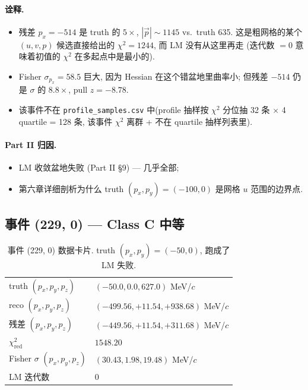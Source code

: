 \paragraph{诠释.}
\begin{itemize}[nosep]
  \item 残差 $p_x = -514$ 是 truth 的 $5\times$, $|\vec p| \sim 1145$ vs.\ truth 635. 这是粗网格的某个 $(u, v, p)$ 候选直接给出的 $\chi^2 = 1244$, 而 LM 没有从这里再走 (迭代数 $= 0$ 意味着初值的 $\chi^2$ 在多起点中是最小的).
  \item Fisher $\sigma_{p_x} = 58.5$ 巨大, 因为 Hessian 在这个错盆地里曲率小; 但残差 $-514$ 仍是 $\sigma$ 的 $8.8\times$, pull $z = -8.78$.
  \item 该事件不在 \texttt{profile\_samples.csv} 中(profile 抽样按 $\chi^2$ 分位抽 32 条 $\times$ 4 quartile = 128 条, 该事件 $\chi^2$ 离群 + 不在 quartile 抽样列表里).
\end{itemize}

\paragraph{Part II 归因.}
\begin{itemize}[nosep]
  \item LM 收敛盆地失败 (Part II §9) — 几乎全部;
  \item 第六章详细剖析为什么 truth $(p_x, p_y) = (-100, 0)$ 是网格 $u$ 范围的边界点.
\end{itemize}

\subsection{事件 (229, 0) — Class C 中等}
\label{sec:partIII:case_studies:event_229}

\begin{table}[H]
\centering\small
\caption{事件 (229, 0) 数据卡片. truth $(p_x, p_y) = (-50, 0)$, 跑成了 LM 失败.}
\begin{tabular}{ll}
\toprule
truth $(p_x, p_y, p_z)$ & $(-50.0, 0.0, 627.0)$ MeV/$c$ \\
reco $(p_x, p_y, p_z)$ & $(-499.56, +11.54, +938.68)$ MeV/$c$ \\
残差 $(p_x, p_y, p_z)$ & $(-449.56, +11.54, +311.68)$ MeV/$c$ \\
$\chi^2_{\mathrm{red}}$ & $1548.20$ \\
Fisher $\sigma$ $(p_x, p_y, p_z)$ & $(30.43, 1.98, 19.48)$ MeV/$c$ \\
LM 迭代数 & 0 \\
\bottomrule
\end{tabular}
\end{table}

